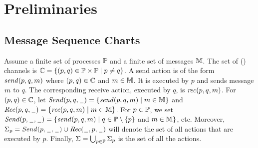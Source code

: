 \documentclass[a4paper,UKenglish,cleveref, autoref, thm-restate]{lipics-v2021}
\begin{document}
\section{Preliminaries}



\subsection{Message Sequence Charts}

Assume a finite set of processes $\Procs$ and a finite set of messages $\Msg$.
The set of (\pp) channels is $\Ch = \{(p,q) \in \Procs \times \Procs \mid p \neq q\}$.
%
A send action is of the form $\sact{p}{q}{\msg}$
where $(p,q) \in \Ch$ and $\msg \in \Msg$.
It is executed by $p$ and sends message $\msg$ to $q$.
The corresponding receive action, executed by $q$, is
$\ract{p}{q}{\msg}$.
%
For $(p,q) \in \Ch$, let
$\pqsAct{p}{q} = \{\sact{p}{q}{\msg} \mid \msg \in \Msg\}$ and
$\pqrAct{p}{q} = \{\ract{p}{q}{\msg} \mid \msg \in \Msg\}$.
For $p \in \Procs$, we set
$\psAct{p} = \{\sact{p}{q}{\msg} \mid q \in \Procs \setminus \{p\}$ and $\msg \in \Msg\}$, etc.
Moreover, $\pAct{p} = \psAct{p} \cup \qrAct{p}$ will denote the set of all actions that are
executed by $p$.
Finally, $\Act = \bigcup_{p \in \Procs} \pAct{p}$
is the set of all the actions.
\end{document}
